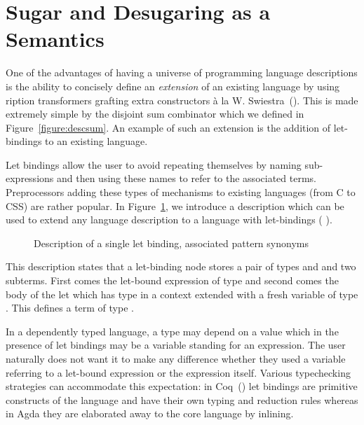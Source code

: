 \section{Sugar and Desugaring as a Semantics}\label{section:letbinding}

One of the advantages of having a universe of programming language
descriptions is the ability to concisely define an \emph{extension}
of an existing language by using ription transformers
grafting extra constructors à la W. Swiestra~(\citeyear{swierstra_2008}).
This is made extremely simple by the disjoint sum combinator
 which we defined in Figure~\ref{figure:descsum}.
An example of such an extension is the addition of let-bindings to
an existing language.

Let bindings allow the user to avoid repeating themselves by naming
sub-expressions and then using these names to refer to the associated
terms. Preprocessors adding these types of mechanisms to existing
languages (from C to CSS) are rather popular. In Figure~\ref{defn:letD},
we introduce a description  which can be used to extend any
language description  to a language with let-bindings
(  ).

\begin{figure}[h]
\begin{minipage}[t]{0.45\textwidth}
\end{minipage}
\begin{minipage}[t]{0.45\textwidth}
\end{minipage}
\caption{Description of a single let binding, associated pattern synonyms
  \label{defn:letD}}
\end{figure}

This description states that a let-binding node stores a pair of types
 and  and two subterms. First comes the let-bound
expression of type  and second comes the body of the let which
has type  in a context extended with a fresh variable of type
. This defines a term of type .

In a dependently typed language, a type may depend on a value which
in the presence of let bindings may be a variable standing for an
expression. The user naturally does not want it to make any difference
whether they used a variable referring to a let-bound expression or
the expression itself. Various typechecking strategies can accommodate
this expectation: in Coq~(\cite{Coq:manual}) let bindings are primitive
constructs of the language and have their own typing and reduction
rules whereas in Agda they are elaborated away to the core language
by inlining.

